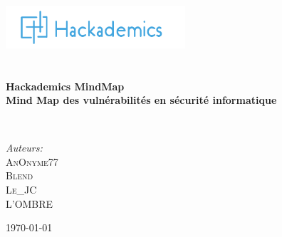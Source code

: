 



\begin{titlepage}
\begin{center}

\includegraphics[width=0.5\textwidth]{Coverpage/logo}~\\[1cm]

\textsc{\Large }\\[0.5cm]

\HRule \\[0.4cm]

{\huge \bfseries Hackademics MindMap\\
Mind Map des vulnérabilités en sécurité informatique \\[0.4cm] }

\HRule \\[1.5cm]

\begin{minipage}{0.4\textwidth}
\begin{flushleft} \large
\emph{Auteurs:}\\
\textsc{AnOnyme77}\\
\textsc{Blend}\\
\textsc{Le\_JC}\\
\textsc{L'OMBRE}
\end{flushleft}
\end{minipage}

\vfill

{\large \today}

\end{center}
\end{titlepage}

\endinput
